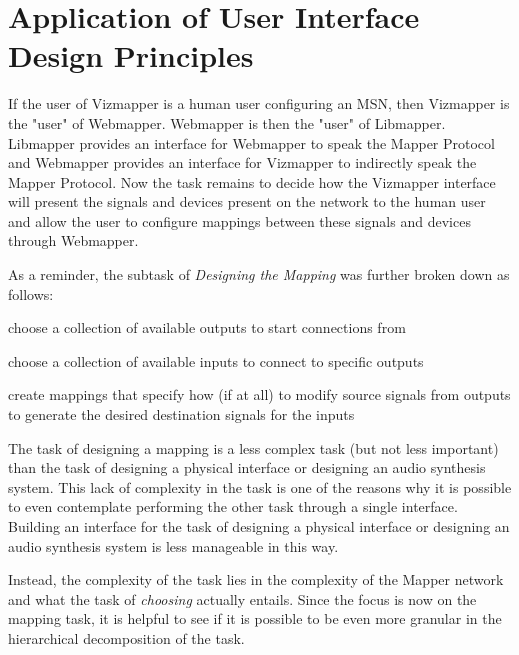 \section{Application of User Interface Design Principles}

If the user of Vizmapper is a human user configuring an MSN, then Vizmapper is the "user" of Webmapper. Webmapper is then the "user" of Libmapper. Libmapper provides an interface for Webmapper to speak the Mapper Protocol and Webmapper provides an interface for Vizmapper to indirectly speak the Mapper Protocol. Now the task remains to decide how the Vizmapper interface will present the signals and devices present on the network to the human user and allow the user to configure mappings between these signals and devices through Webmapper.

As a reminder, the subtask of \emph{Designing the Mapping} was further broken down as follows:

\begin{description}
	\item choose a collection of available outputs to start connections from
	\item choose a collection of available inputs to connect to specific outputs
	\item create mappings that specify how (if at all) to modify source signals from outputs to generate the desired destination signals for the inputs
\end{description}

The task of designing a mapping is a less complex task (but not less important) than the task of designing a physical interface or designing an audio synthesis system. This lack of complexity in the task is one of the reasons why it is possible to even contemplate performing the other task through a single interface. Building an interface for the task of designing a physical interface or designing an audio synthesis system is less manageable in this way.

Instead, the complexity of the task lies in the complexity of the Mapper network and what the task of \emph{choosing} actually entails. Since the focus is now on the mapping task, it is helpful to see if it is possible to be even more granular in the hierarchical decomposition of the task. 

